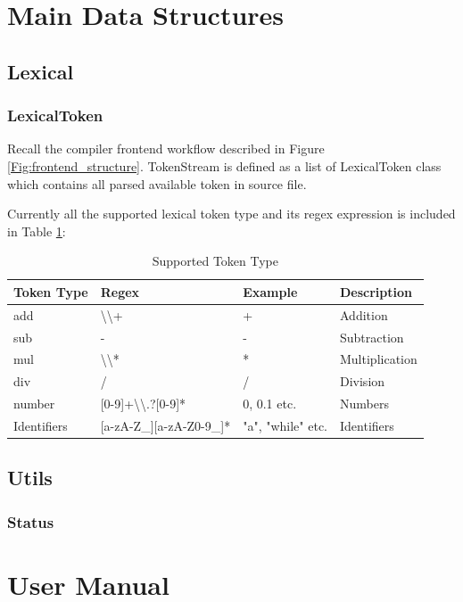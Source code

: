 \documentclass{article}
\begin{document}
\section{Main Data Structures}
    \subsection{Lexical}
        \subsubsection{LexicalToken }
            Recall the compiler frontend workflow described in Figure \ref{Fig:frontend_structure}. TokenStream is defined as a list of LexicalToken class which contains all parsed available token in source file.\par
            Currently all the supported lexical token type and its regex expression is included in Table \ref{table:supported_lexical_token_list}: \par
            \begin{table}[hb!]
                \centering
                \begin{tabular}{l|lll}
                    \hline
                    Token Type  & Regex                                                  & Example           & Description    \\ \hline
                    add         & \textbackslash{}\textbackslash{}+                      & +                 & Addition       \\
                    sub         & -                                                      & -                 & Subtraction    \\
                    mul         & \textbackslash{}\textbackslash{}*                      & *                 & Multiplication \\
                    div         & /                                                      & /                 & Division       \\
                    number      & {[}0-9{]}+\textbackslash{}\textbackslash{}.?{[}0-9{]}* & 0, 0.1 etc.       & Numbers        \\
                    Identifiers & {[}a-zA-Z\_{]}{[}a-zA-Z0-9\_{]}*                       & "a", "while" etc. & Identifiers    \\ \hline
                \end{tabular}
                \caption{Supported Token Type}
                \label{table:supported_lexical_token_list}
            \end{table}
    \subsection{Utils}
        \subsubsection{Status }
\section{User Manual}

\printindex
\end{document}
